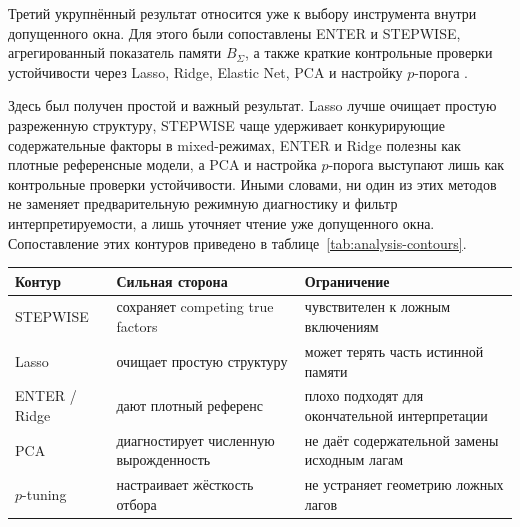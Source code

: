 Третий укрупнённый результат относится уже к выбору инструмента внутри допущенного окна. Для этого были сопоставлены ENTER и STEPWISE, агрегированный показатель памяти \(B_\Sigma\), а также краткие контрольные проверки устойчивости через Lasso, Ridge, Elastic Net, PCA и настройку \(p\)-порога \cite{hastie,james}.

Здесь был получен простой и важный результат. Lasso лучше очищает простую разреженную структуру, STEPWISE чаще удерживает конкурирующие содержательные факторы в mixed-режимах, ENTER и Ridge полезны как плотные референсные модели, а PCA и настройка \(p\)-порога выступают лишь как контрольные проверки устойчивости. Иными словами, ни один из этих методов не заменяет предварительную режимную диагностику и фильтр интерпретируемости, а лишь уточняет чтение уже допущенного окна.
Сопоставление этих контуров приведено в таблице~\ref{tab:analysis-contours}.

\begin{center}
\label{tab:analysis-contours}
\end{center}

{\def\LTcaptype{none} %
\begin{longtable}[]{@{}
  >{\raggedright\arraybackslash}p{}
  >{\raggedright\arraybackslash}p{}
  >{\raggedright\arraybackslash}p{}@{}}
\toprule\noalign{}
\begin{minipage}[b]{\linewidth}\raggedright
Контур
\end{minipage} & \begin{minipage}[b]{\linewidth}\raggedright
Сильная сторона
\end{minipage} & \begin{minipage}[b]{\linewidth}\raggedright
Ограничение
\end{minipage} \\
\midrule\noalign{}
\endhead
\bottomrule\noalign{}
\endlastfoot
STEPWISE & сохраняет competing true factors & чувствителен к ложным включениям \\
Lasso & очищает простую структуру & может терять часть истинной памяти \\
ENTER / Ridge & дают плотный референс & плохо подходят для окончательной интерпретации \\
PCA & диагностирует численную вырожденность & не даёт содержательной замены исходным лагам \\
\(p\)-tuning & настраивает жёсткость отбора & не устраняет геометрию ложных лагов \\
\end{longtable}
}


